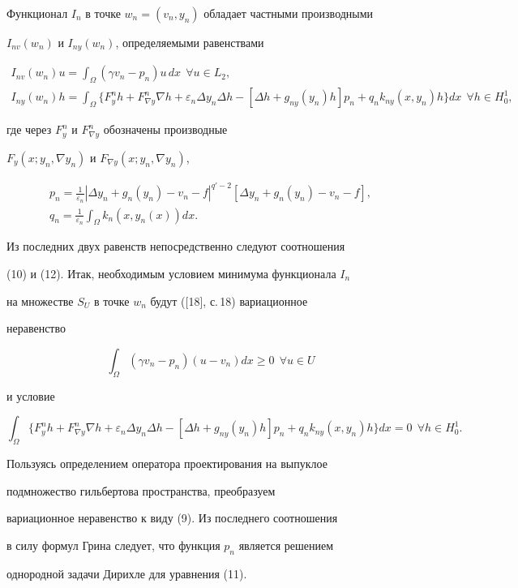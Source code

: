 \begin{pf} 


Функционал $I_n$ в точке $w_n=(v_n,y_n)$ обладает частными производными 


$I_{nv}(w_n)$ и $I_{ny}(w_n)$, определяемыми равенствами 


\begin{gather*} 


I_{nv}(w_n)u=\int_\Omega(\gamma v_n-p_n)u\,dx 


\ \ \forall u\in L_2,\\ 


% 


I_{ny}(w_n)h=\int_\Omega\{F^n_y h+F^n_{\nabla y}\nabla h+ 


\varepsilon_n\Delta y_n\Delta h-[\Delta h+g_{ny}(y_n)h]p_n+ 


q_n k_{ny}(x,y_n)h\}dx\ \ \forall h\in H^1_0, 


\end{gather*} 


где через $F^n_y$ и $F^n_{\nabla y}$ обозначены производные 


$F_y(x;y_n,\nabla y_n)$ и $F_{\nabla y}(x;y_n,\nabla y_n)$, 


\begin{gather*} 


p_n=\frac{1}{\varepsilon_n}|\Delta y_n+g_n(y_n)-v_n-f|^{q'-2} 


[\Delta y_n+g_n(y_n)-v_n-f],\\ 


q_n=\frac{1}{\varepsilon_n}\int_\Omega k_n(x,y_n(x))dx. 


\end{gather*} 


Из последних двух равенств непосредственно следуют соотношения 


(10) и (12). Итак, необходимым условием минимума функционала $I_n$ 


на множестве $S_U$ в точке $w_n$ будут ([18], с.\,18) вариационное 


неравенство 


$$ 


\int_\Omega(\gamma v_n-p_n)(u-v_n)dx\ge0\ \ \forall u\in U 


$$ 


и условие 


$$ 


\int_\Omega\{F^n_y h+F^n_{\nabla y}\nabla h+\varepsilon_n 


\Delta y_n\Delta h-[\Delta h+g_{ny}(y_n)h]p_n+q_n k_{ny} 


(x,y_n)h\}dx=0\ \ \forall h\in H^1_0. 


$$ 


Пользуясь определением оператора проектирования на выпуклое 


подмножество гильбертова пространства, преобразуем 


вариационное неравенство к виду (9). Из последнего соотношения 


в силу формул Грина следует, что функция $p_n$ является решением 


однородной задачи Дирихле для уравнения (11). 


\end{pf} 


